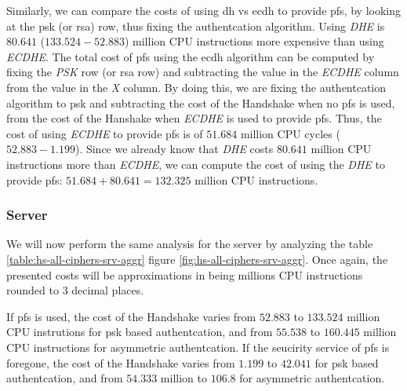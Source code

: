 \documentclass{llncs}
\begin{document}
Similarly, we can compare the costs of using \gls{dh} vs \gls{ecdh} to provide \gls{pfs}, by
looking at the \gls{psk} (or \gls{rsa}) row, thus fixing the authentcation algorithm. Using \textit{DHE} is 
$80.641$ ($133.524 - 52.883$) million CPU instructions more expensive than using \textit{ECDHE}. The total cost of \gls{pfs}
using the \gls{ecdh} algorithm can be computed by fixing the \textit{PSK} row (or \gls{rsa} row) 
and subtracting the value in the \textit{ECDHE} column from the value in the \textit{X} column. By doing this, we are 
fixing the authentcation algorithm to \gls{psk} and subtracting the cost of the Handshake when no \gls{pfs} is used, 
from the cost of the Hanshake when \textit{ECDHE} is used to provide \gls{pfs}. Thus, the cost of using \textit{ECDHE}
to provide \gls{pfs} is of $51.684$ million CPU cycles ($52.883-1.199$). Since we already know that \textit{DHE} costs
$80.641$ million CPU instructions more than \textit{ECDHE}, we can compute the cost of using the \textit{DHE} to
provide \gls{pfs}: $51.684+80.641=132.325$ million CPU instructions.

\subsubsection{Server}

We will now perform the same analysis for the server by analyzing the table \ref{table:hs-all-ciphers-srv-aggr} 
figure \ref{fig:hs-all-ciphers-srv-aggr}. Once again, the presented costs will be approximations in
being millions CPU instructions rounded to $3$ decimal places.

If \gls{pfs} is used, the cost of the Handshake varies from $52.883$ to $133.524$ 
million CPU instrutions for \gls{psk} based authentcation, and from $55.538$ to $160.445$ million CPU instructions for 
asymmetric authentcation. If the seucirity service of \gls{pfs} is foregone, the cost
of the Handshake varies from $1.199$  to $42.041$ for \gls{psk} based authentcation,
and from $54.333$ million to $106.8$ for asymmetric authentcation.
\end{document}
